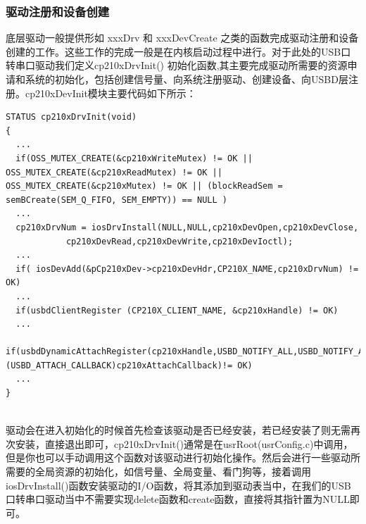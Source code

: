 \subsubsection{驱动注册和设备创建} 
	
	底层驱动一般提供形如 xxxDrv 和 xxxDevCreate 之类的函数完成驱动注册和设备创建的工作。这些工作的完成一般是在内核启动过程中进行。对于此处的USB口转串口驱动我们定义cp210xDrvInit() 初始化函数,其主要完成驱动所需要的资源申请和系统的初始化，包括创建信号量、向系统注册驱动、创建设备、向USBD层注册。cp210xDevInit模块主要代码如下所示：
\lstset{language=C}
\begin{lstlisting}
STATUS cp210xDrvInit(void)
{
  ...
  if(OSS_MUTEX_CREATE(&cp210xWriteMutex) != OK || OSS_MUTEX_CREATE(&cp210xReadMutex) != OK || OSS_MUTEX_CREATE(&cp210xMutex) != OK || (blockReadSem = semBCreate(SEM_Q_FIFO, SEM_EMPTY)) == NULL )
  ... 	
  cp210xDrvNum = iosDrvInstall(NULL,NULL,cp210xDevOpen,cp210xDevClose,
			cp210xDevRead,cp210xDevWrite,cp210xDevIoctl);
  ...
  if( iosDevAdd(&pCp210xDev->cp210xDevHdr,CP210X_NAME,cp210xDrvNum) != OK)
  ...  
  if(usbdClientRegister (CP210X_CLIENT_NAME, &cp210xHandle) != OK)
  ...  
  if(usbdDynamicAttachRegister(cp210xHandle,USBD_NOTIFY_ALL,USBD_NOTIFY_ALL,USBD_NOTIFY_ALL,TRUE,(USBD_ATTACH_CALLBACK)cp210xAttachCallback)!= OK)
  ...
}
\end{lstlisting}\\

	驱动会在进入初始化的时候首先检查该驱动是否已经安装，若已经安装了则无需再次安装，直接退出即可，cp210xDrvInit()通常是在usrRoot(usrConfig.c)中调用，但是你也可以手动调用这个函数对该驱动进行初始化操作。然后会进行一些驱动所需要的全局资源的初始化，如信号量、全局变量、看门狗等，接着调用iosDrvInstall()函数安装驱动的I/O函数，将其添加到驱动表当中，在我们的USB口转串口驱动当中不需要实现delete函数和create函数，直接将其指针置为NULL即可。
	
